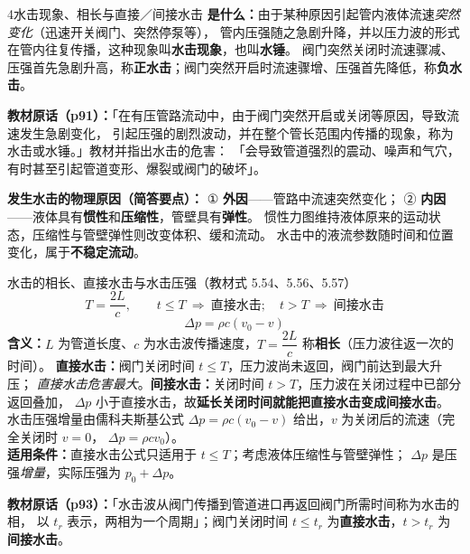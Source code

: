 \begin{kaodian}{4}{水击现象、相长与直接／间接水击}
\textbf{是什么：}由于某种原因引起管内液体流速\emph{突然变化}（迅速开关阀门、突然停泵等），
管内压强随之急剧升降，并以压力波的形式在管内往复传播，这种现象叫\textbf{水击现象}，也叫\textbf{水锤}。
阀门突然关闭时流速骤减、压强首先急剧升高，称\textbf{正水击}；阀门突然开启时流速骤增、压强首先降低，称\textbf{负水击}。

\noindent\textbf{教材原话（p91）：}「在有压管路流动中，由于阀门突然开启或关闭等原因，导致流速发生急剧变化，
引起压强的剧烈波动，并在整个管长范围内传播的现象，称为水击或水锤。」教材并指出水击的危害：
「会导致管道强烈的震动、噪声和气穴，有时甚至引起管道变形、爆裂或阀门的破坏」。

\textbf{发生水击的物理原因（简答要点）：}
① \textbf{外因}——管路中流速突然变化；
② \textbf{内因}——液体具有\textbf{惯性}和\textbf{压缩性}，管壁具有\textbf{弹性}。
惯性力图维持液体原来的运动状态，压缩性与管壁弹性则改变体积、缓和流动。
水击中的液流参数随时间和位置变化，属于\textbf{不稳定流动}。

\begin{gongshi}{水击的相长、直接水击与水击压强（教材式 5.54、5.56、5.57）}
\[ T=\frac{2L}{c},\qquad
   t\le T\ \Rightarrow\ \text{直接水击};\quad t>T\ \Rightarrow\ \text{间接水击} \]
\[ \Delta p=\rho c\left(v_0-v\right) \]
\textbf{含义：}$L$ 为管道长度、$c$ 为水击波传播速度，$T=\dfrac{2L}{c}$ 称\textbf{相长}（压力波往返一次的时间）。
\textbf{直接水击：}阀门关闭时间 $t\le T$，压力波尚未返回，阀门前达到最大升压；
\emph{直接水击危害最大}。\textbf{间接水击：}关闭时间 $t>T$，压力波在关闭过程中已部分返回叠加，
$\Delta p$ 小于直接水击，故\textbf{延长关闭时间就能把直接水击变成间接水击}。
水击压强增量由儒科夫斯基公式 $\Delta p=\rho c(v_0-v)$ 给出，$v$ 为关闭后的流速（完全关闭时 $v=0$，
$\Delta p=\rho c v_0$）。\\
\textbf{适用条件：}直接水击公式只适用于 $t\le T$；考虑液体压缩性与管壁弹性；
$\Delta p$ 是压强\emph{增量}，实际压强为 $p_0+\Delta p$。
\end{gongshi}

\noindent\textbf{教材原话（p93）：}「水击波从阀门传播到管道进口再返回阀门所需时间称为水击的相，
以 $t_r$ 表示，两相为一个周期」；阀门关闭时间 $t\le t_r$ 为\textbf{直接水击}，$t>t_r$ 为\textbf{间接水击}。


\end{kaodian}
